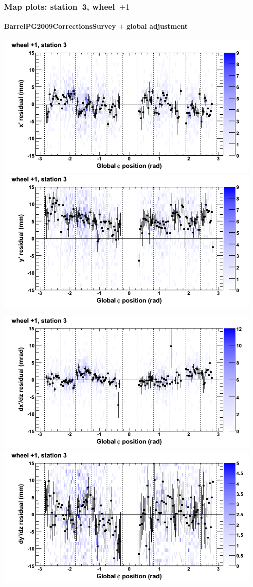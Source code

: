 \documentclass[compress]{beamer}
\begin{document}
\begin{frame}
\frametitle{Map plots: station~3, wheel~$+1$}
\framesubtitle{BarrelPG2009CorrectionsSurvey $+$ global adjustment}
\includegraphics[width=0.5\linewidth]{mapplots_re01/DTvsphi_st3whD_x.png}
\includegraphics[width=0.5\linewidth]{mapplots_re01/DTvsphi_st3whD_y.png}

\includegraphics[width=0.5\linewidth]{mapplots_re01/DTvsphi_st3whD_dxdz.png}
\includegraphics[width=0.5\linewidth]{mapplots_re01/DTvsphi_st3whD_dydz.png}
\end{frame}
\end{document}

